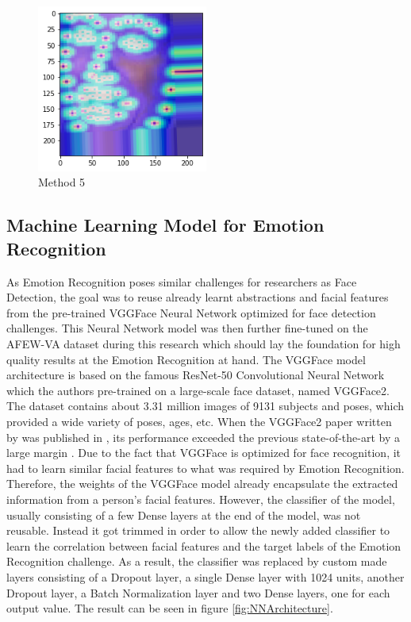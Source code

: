 \begin{center}
\begin{figure}[H]
  \begin{center}
  \includegraphics[angle=0, width=0.5\textwidth]{Figures/method_5.png}
  \caption{Method 5}
  \label{fig:MachineLearningModelMethod_5}
  \end{center}
\end{figure}
\end{center}


\subsection{Machine Learning Model for Emotion Recognition}
As Emotion Recognition poses similar challenges for researchers as Face Detection, the goal was to reuse already learnt abstractions and facial features from the pre-trained VGGFace Neural Network optimized for face detection challenges. This Neural Network model was then further fine-tuned on the AFEW-VA dataset during this research which should lay the foundation for high quality results at the Emotion Recognition at hand.
\newline\newline
The VGGFace model architecture is based on the famous ResNet-50 Convolutional Neural Network which the authors \citet{Cao:2018:VGGFace2} pre-trained on a large-scale face dataset, named VGGFace2. The dataset contains about 3.31 million images of 9131 subjects and poses, which provided a wide variety of poses, ages, etc. When the VGGFace2 paper written by \citet{Cao:2018:VGGFace2} was published in \citeyear{Cao:2018:VGGFace2}, its performance exceeded the previous state-of-the-art by a large margin \citep{Cao:2018:VGGFace2}.
\newline\newline
Due to the fact that VGGFace is optimized for face recognition, it had to learn similar facial features to what was required by Emotion Recognition. Therefore, the weights of the VGGFace model already encapsulate the extracted information from a person's facial features. However, the classifier of the model, usually consisting of a few Dense layers at the end of the model, was not reusable. Instead it got trimmed in order to allow the newly added classifier to learn the correlation between facial features and the target labels of the Emotion Recognition challenge. As a result, the classifier was replaced by custom made layers consisting of a Dropout layer, a single Dense layer with 1024 units, another Dropout layer, a Batch Normalization layer and two Dense layers, one for each output value. The result can be seen in figure \ref{fig:NNArchitecture}.